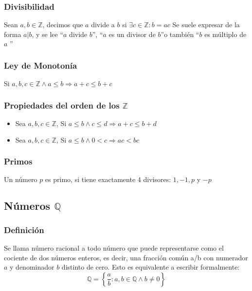      \subsubsection{Divisibilidad}
      Sean $a,b \in \mathbb{Z}$, decimos que $a$ divide a $b$ si $\exists c \in \mathbb{Z}:  b=ac$ \newline
      Se suele expresar de la forma $a|b$, y se lee ``$a$ divide $b$'', ``$a$ es un divisor de $b$''o tambi\'en  ``$b$ es m\'ultiplo de $a$ ''

   \subsubsection{Ley de Monoton\'ia}
   Si $a, b, c\in \mathbb{Z} \wedge a \leq b \Rightarrow a+c \leq b+c$

   \subsubsection{Propiedades del orden de los $\mathbb{Z}$}
   \begin{itemize}
    \item Sea $ a,b,c \in \mathbb{Z}$, Si $ a \leq b \wedge c \leq d \Rightarrow a+c \leq b+d$
     \item Sea $ a,b,c \in \mathbb{Z}$, Si $ a \leq b \wedge 0 < c \Rightarrow ac < bc$
   \end{itemize}

   \subsubsection{Primos}
   Un n\'umero $p$ es primo, si tiene exactamente 4 divisores: $1, -1, p$ y $-p$

   \subsection{N\'umeros $\mathbb{Q}$}
      \subsubsection{Definici\'on}
      Se llama número racional a todo número que puede representarse como el cociente de dos números enteros, es decir, una fracción común a/b con numerador $a$ y denominador $b$ distinto de cero. \newline
      Esto es equivalente a escribir formalmente:
      \begin{displaymath}
	 \mathbb{Q}= \left\{ \frac{a}{b}: a,b \in \mathbb{Q} \wedge b \neq 0 \right\} 
      \end{displaymath}
